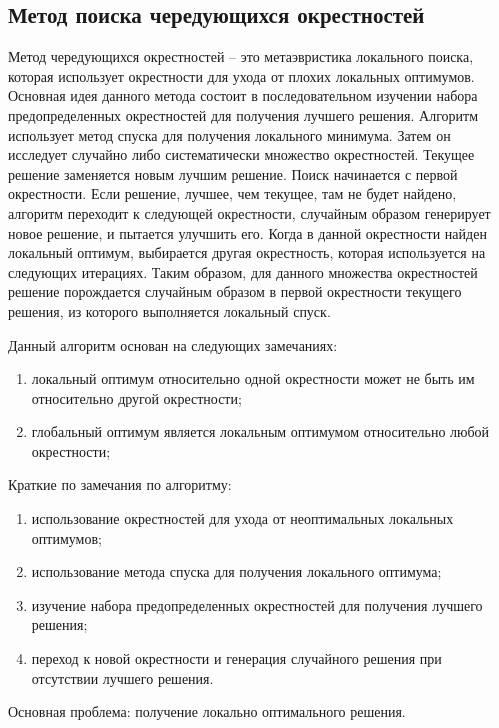 \subsection{Метод поиска чередующихся окрестностей}
Метод чередующихся окрестностей -- это метаэвристика локального поиска, которая использует окрестности 
для ухода от плохих локальных оптимумов. Основная идея данного метода состоит в последовательном изучении 
набора предопределенных окрестностей для получения лучшего решения. Алгоритм использует метод спуска для 
получения локального минимума. Затем он исследует случайно либо систематически множество окрестностей. 
Текущее решение заменяется новым лучшим решение. Поиск начинается с первой окрестности. Если решение, лучшее, 
чем текущее, там не будет найдено, алгоритм переходит к следующей окрестности, случайным образом генерирует 
новое решение, и пытается улучшить его. Когда в данной окрестности найден локальный оптимум, выбирается 
другая окрестность, которая используется на следующих итерациях. Таким образом, для данного множества 
окрестностей решение порождается случайным образом в первой окрестности текущего решения, из которого 
выполняется локальный спуск.

Данный алгоритм основан на следующих замечаниях:
\begin{enumerate}
    \item локальный оптимум относительно одной окрестности может не быть им относительно другой окрестности;
    \item глобальный оптимум является локальным оптимумом относительно любой окрестности;
\end{enumerate}

Краткие по замечания по алгоритму:
\begin{enumerate}
    \item использование окрестностей для ухода от неоптимальных локальных оптимумов;
    \item использование метода спуска для получения локального оптимума;
    \item изучение набора предопределенных окрестностей для получения лучшего решения;
    \item переход к новой окрестности и генерация случайного решения при отсутствии лучшего решения.
\end{enumerate}

Основная проблема: получение локально оптимального решения.

